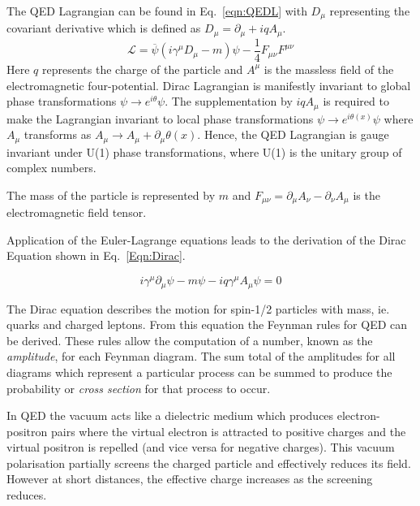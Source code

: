The QED Lagrangian can be found in Eq.~\ref{eqn:QEDL} with $D_{\mu}$ representing the covariant derivative which is defined as $D_{\mu} = \partial_{\mu} + iqA_{\mu}$. 
\begin{equation}
\mathcal{L} = \overline{\psi}\left(i\gamma^{\mu}D_{\mu}-m\right)\psi - \frac{1}{4}F_{\mu\nu}F^{\mu\nu}
\label{eqn:QEDL}
\end{equation}
Here $q$ represents the charge of the particle and $A^{\mu}$ is the massless field of the electromagnetic four-potential. Dirac Lagrangian is manifestly invariant to global phase transformations $\psi \rightarrow e^{i\theta} \psi$. The supplementation by $iqA_{\mu}$ is required to make the Lagrangian invariant to local phase transformations $\psi \rightarrow e^{i\theta(x)} \psi$ where $A_{\mu}$ transforms as $A_{\mu} \rightarrow A_{\mu} + \partial_{\mu}\theta(x)$. Hence, the QED Lagrangian is gauge invariant under U(1) phase transformations, where U(1) is the unitary group of complex numbers. 

The mass of the particle is represented by $m$ and $F_{\mu\nu} = \partial_{\mu}A_{\nu} - \partial_{\nu}A_{\mu}$ is the electromagnetic field tensor.

Application of the Euler-Lagrange equations leads to the derivation of the Dirac Equation shown in Eq.~\ref{Eqn:Dirac}.

\begin{equation}
i\gamma^{\mu }\partial _{\mu }\psi -m\psi - iq\gamma^{\mu }A_{\mu}\psi = 0
\label{Eqn:Dirac}
\end{equation}

The Dirac equation describes the motion for spin-1/2 particles with mass, ie. quarks and charged leptons. From this equation the Feynman rules for QED can be derived. These rules allow the computation of a number, known as the \emph{amplitude}, for each Feynman diagram. The sum total of the amplitudes for all diagrams which represent a particular process can be summed to produce the probability or \emph{cross section} for that process to occur.

In QED the vacuum acts like a dielectric medium which produces electron-positron pairs where the virtual electron is attracted to positive charges and the virtual positron is repelled (and vice versa for negative charges). This vacuum polarisation partially screens the charged particle and effectively reduces its field. However at short distances, the effective charge increases as the screening reduces.

